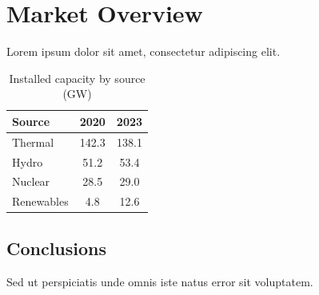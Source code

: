 \documentclass{article}
\begin{document}
\section{Market Overview}

Lorem ipsum dolor sit amet, consectetur adipiscing elit.

\begin{table}[H]
\centering
\caption{Installed capacity by source (GW)}
\label{tab:capacity}
\begin{tabular}{lcc}
\toprule
\textbf{Source} & \textbf{2020} & \textbf{2023} \\
\midrule
Thermal & 142.3 & 138.1 \\
Hydro & 51.2 & 53.4 \\
Nuclear & 28.5 & 29.0 \\
Renewables & 4.8 & 12.6 \\
\bottomrule
\end{tabular}
\end{table}

\subsection{Conclusions}

Sed ut perspiciatis unde omnis iste natus error sit voluptatem.
\end{document}
